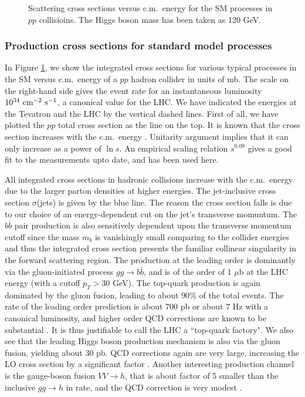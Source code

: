 \documentclass[prd,aps,floats,preprintnumbers,preprint,superscriptaddress,floatfix,nofootinbib]{revtex4}
\begin{document}
\begin{center}
\begin{figure}[tb]
\caption{Scattering cross sections versus c.m.~energy
for the SM processes in $pp$ collisioins. 
 The Higgs boson mass has been taken as 120 GeV.}
\label{fig:hadron}
\end{figure}
\end{center}

\subsubsection{Production cross sections for standard model processes} 
In Figure \ref{fig:hadron}, we show the integrated cross sections for various typical 
processes in the SM versus c.m.~energy of a $pp$ hadron collider in units of mb.  
The scale on the right-hand side gives the event rate for an instantaneous luminosity
$10^{34}\ {\rm cm}^{-2}\ {\rm s}^{-1}$, a canonical value for the LHC.
We have indicated the energies at the Tevatron 
and the LHC by the vertical dashed lines. 
First of all, we have plotted the $pp$ total cross section as the line on 
the top. It is known that the cross section increases with the 
c.m.~energy \cite{ttwu}.
Unitarity argument implies that it can only increase as a power of $\ln s$. 
An empirical scaling relation $s^{0.09}$ gives a good fit to the 
measurements upto date, and has been used here. 

All integrated cross sections in hadronic collisions increase with the 
c.m.~energy due to the larger parton densities at higher energies. 
The jet-inclusive cross section $\sigma$(jets) is given by the blue line.
The reason the cross section falls is due to our choice of an
energy-dependent cut on the jet's transverse momuntum. 
The $b\bar b$ pair production is also
sensitively dependent upon the transverse momentum cutoff since the
mass $m_b$ is vanishingly small comparing to the collider energies
and thus the integrated cross section presents the familiar collinear 
singularity in the forward scattering region. 
The production at the leading order is dominantly via the gluon-initiated
process $gg\to b \bar b$, and is of the order of 1 $\mu$b at the LHC
energy (with a cutoff $p_T>30$ GeV). The top-quark production is
again dominated by the gluon fusion, leading to about $90\%$ of the
total events. The rate of the leading order prediction 
is about 700 pb or about 7 Hz with a canonical luminosity, and
higher order QCD corrections are known to be substantial \cite{top}.
It is thus justifiable to call the LHC a ``top-quark factory".
We also see that the leading Higgs boson production mechanism 
is also via the gluon fusion, yielding about 30 pb. QCD corrections
again are very large, increasing the LO cross section by a significant
factor \cite{ggh}. Another interesting
production channel is the gauge-boson fusion $VV\to h$, that is
about factor of 5 smaller than the inclusive $gg\to h$ in rate,
and the QCD correction is very modest \cite{vvh}. 
\end{document}
